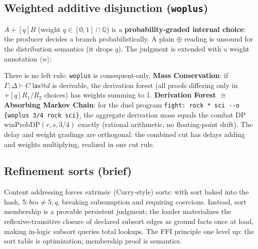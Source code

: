 \documentclass[11pt]{article}
\makeatletter
\newcommand{\adddisj}{\oplus}                   %
\newcommand{\wop}[1]{+[{#1}]}
\newcommand{\Q}{\mathbb{Q}}
\newcommand{\jlaxw}[3]{#1\;\mathsf{lax}@{#2}\;\langle #3\rangle}
\theoremstyle{remark}
\makeatother
\begin{document}
\subsection{Weighted additive disjunction (\texttt{woplus})}
\label{sec:woplus}

$A \wop{q} B$ (weight $q \in [0,1] \cap \Q$) is a
\textbf{probability-graded internal choice}: the producer decides a branch
probabilistically.  A plain $\adddisj$ reading is unsound for the distribution
semantics (it drops $q$).  The judgment is extended with a weight annotation
$\langle w\rangle$:


There is no left rule: \texttt{woplus} is consequent-only.  \textbf{Mass
Conservation}: if $\Gamma;\Delta \vdash C\;\mathsf{lax}@d$ is derivable, the
derivation forest (all proofs differing only in $+[q]R_1/R_2$ choices) has
weights summing to 1.  \textbf{Derivation Forest $\cong$ Absorbing Markov
Chain}: for the duel program
\texttt{fight: rock * sci -{}-o \{woplus 3/4 rock sci\}}, the aggregate
derivation mass equals the combat DP $\mathrm{winProbDP}(r,s,3/4)$ exactly
(rational arithmetic, no floating-point drift).  The delay and weight gradings
are orthogonal: the combined cut has delays adding and weights multiplying,
realized in one cut rule.

\subsection{Refinement sorts (brief)}
\label{sec:refinement-sorts}

Content addressing forces extrinsic (Curry-style) sorts: with sort baked into
the hash, $5{:}\mathit{bin} \neq 5{:}q$, breaking subsumption and requiring
coercions.  Instead, sort membership is a provable persistent judgment; the
loader materializes the reflexive-transitive closure of declared subsort edges as
ground facts once at load, making in-logic subsort queries total lookups.  The
FFI principle one level up: the sort table is optimization, membership proof is
semantics.

\end{document}
